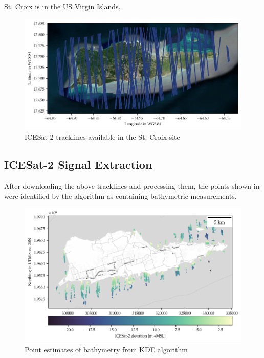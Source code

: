 St. Croix is in the US Virgin Islands. 

\begin{figure}[h]
    \centering
    \includegraphics[width=\textwidth]{figures/Stcroix_tracklines.pdf}
    \caption{ICESat-2 tracklines available in the St. Croix site}
    \label{fig:st-croix-tracklines}
\end{figure}

\subsection{ICESat-2 Signal Extraction}
After downloading the above tracklines and processing them, the points shown in were identified by the algorithm as containing bathymetric measurements.

\begin{figure}[h]
    \centering
    \includegraphics[width=\textwidth]{figures/Stcroix_photon_map.pdf}
    \caption{Point estimates of bathymetry from KDE algorithm}
    \label{fig:stcroix-bathy-points}
\end{figure}

